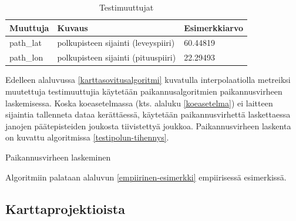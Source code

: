 \documentclass[
  12pt,
  a4paper, twoside]{book}
\begin{document}
\def\arraystretch{1.25} 
\begin{table}[H]
\centering
\begin{tabular}{|l|l|l|}
\hline
Muuttuja & Kuvaus & Esimerkkiarvo\\
\hline
path\_lat & polkupisteen sijainti (leveyspiiri) & 60.44819 \\
path\_lon & polkupisteen sijainti (pituuspiiri) & 22.29493 \\
\hline
\end{tabular}
\caption{Testimuuttujat}
\label{tab:testimuuttujat}
\end{table}

\noindent Edelleen alaluvussa \ref{karttasovitusalgoritmi} kuvatulla interpolaatiolla metreiksi muutettuja testimuuttujia käytetään paikannusalgoritmien paikannusvirheen laskemisessa. Koska koeasetelmassa (kts. alaluku \ref{koeasetelma}) ei laitteen sijaintia tallenneta dataa kerättäessä, käytetään paikannusvirhettä laskettaessa janojen päätepisteiden joukosta tiivistettyä joukkoa. Paikannusvirheen laskenta on kuvattu algoritmissa \ref{testipolun-tihennys}.

\begin{algorithm}[H]
\label{testipolun-tihennys}
\DontPrintSemicolon
\SetAlgoShortEnd
{}
\caption{Paikannusvirheen laskeminen}
\end{algorithm}

\noindent Algoritmiin palataan alaluvun \ref{empiirinen-esimerkki} empiirisessä esimerkissä.

\subsection{Karttaprojektioista} \label{karttaprojektioista}
\end{document}

